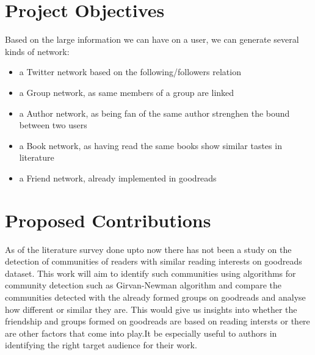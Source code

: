 \documentclass[11pt]{article}
\begin{document}
\section{Project Objectives}

Based on the large information we can have on a user, we can generate several kinds of network:
\begin{itemize}
\item a Twitter network based on the following/followers relation
\item a Group network, as same members of a group are linked
\item a Author network, as being fan of the same author strenghen the bound between two users
\item a Book network, as having read the same books show similar tastes in literature
\item a Friend network, already implemented in goodreads
\end{itemize}









\section{Proposed Contributions}
As of the literature survey done upto now there has not been a study on the detection of communities of readers with similar reading interests on goodreads dataset. This work will aim to identify such communities using algorithms for community detection such as Girvan-Newman algorithm and compare the communities detected with the already formed groups on goodreads and analyse how different or similar they are. This would give us insights into whether the friendship and groups formed on goodreads are based on reading intersts or there are other factors that come into play.It be especially useful to authors in identifying the right target audience for their work.
\end{document}
